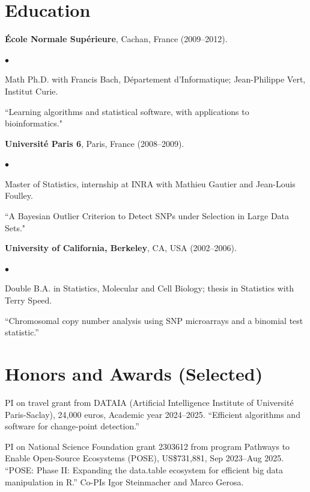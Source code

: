 \documentclass[margin,line]{res}
\newenvironment{list2}{
  \begin{list}{$\bullet$}{%
      \setlength{\itemsep}{0in}
      \setlength{\parsep}{0in} \setlength{\parskip}{0in}
      \setlength{\topsep}{0in} \setlength{\partopsep}{0in} 
      \setlength{\leftmargin}{0.2in}}}{\end{list}}
\begin{document}
\begin{resume}
\section{\sc Education}

{\bf \'{E}cole Normale Sup\'{e}rieure}, Cachan, France (2009--2012).\\
\vspace*{-.1in}
\begin{list2}
\item[] Math Ph.D. with Francis Bach, D\'{e}partement d'Informatique; Jean-Philippe Vert, Institut Curie.
\item[] ``Learning algorithms and statistical software, with applications to bioinformatics."
\end{list2}

{\bf Universit\'e Paris 6}, Paris, France (2008--2009).\\
\vspace*{-.1in}
\begin{list2}
\item[] Master of Statistics, internship at INRA with Mathieu Gautier and Jean-Louis Foulley.
\item[] ``A Bayesian Outlier Criterion to Detect SNPs under Selection in Large Data Sets."
\end{list2}

{\bf University of California, Berkeley}, CA, USA (2002--2006).\\
\vspace*{-.1in}
\begin{list2}
\item[] Double B.A. in Statistics, Molecular and Cell Biology; thesis in Statistics with Terry Speed.
\item[] ``Chromosomal copy number analysis using SNP microarrays and a binomial test statistic.'' 
\end{list2}

\section{\sc Honors and Awards (Selected)}

PI on travel grant from DATAIA (Artificial Intelligence Institute of
Université Paris-Saclay), 24,000 euros, Academic year
2024--2025. ``Efficient algorithms and software for change-point
detection.''

PI on National Science Foundation grant 2303612 from program Pathways to Enable Open-Source Ecosystems (POSE), US\$731,881, Sep
2023--Aug 2025. ``POSE: Phase II: Expanding the data.table ecosystem
for efficient big data manipulation in R.'' Co-PIs Igor Steinmacher
and Marco Gerosa.


\end{resume}
\end{document}
